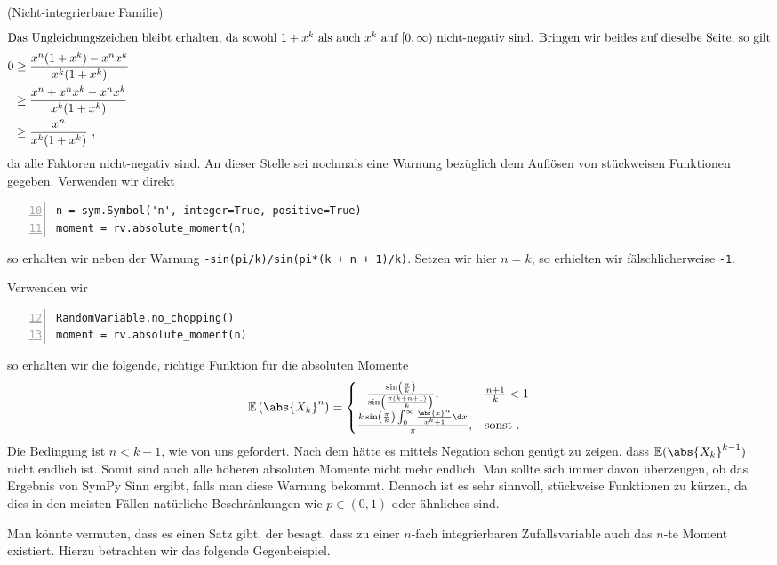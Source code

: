 \begin{Beispiel}{(Nicht-integrierbare Familie)}
\begin{align*}
\intertext{Das Ungleichungszeichen bleibt erhalten, da sowohl $1 + x^k$ als auch $x^k$ auf $[0, \infty)$ nicht-negativ sind. Bringen wir beides auf dieselbe Seite, so gilt}
0 &\geq \frac{x^n (1 + x^k) - x^n x^k}{x^k (1 + x^k)}\\
&\geq \frac{x^n + x^n x^k - x^n x^k}{x^k (1 + x^k)}\\
&\geq \frac{x^n}{x^k (1 + x^k)}~,
\end{align*}
da alle Faktoren nicht-negativ sind. An dieser Stelle sei nochmals eine Warnung bezüglich dem Auflösen von stückweisen Funktionen gegeben. Verwenden wir direkt
\begin{lstlisting}[numbers=left, numberstyle=\tiny\color{codegray}, firstnumber=10]
n = sym.Symbol('n', integer=True, positive=True)
moment = rv.absolute_moment(n)
\end{lstlisting}
so erhalten wir neben der Warnung \lstinline|-sin(pi/k)/sin(pi*(k + n + 1)/k)|. Setzen wir hier $n = k$, so erhielten wir fälschlicherweise \lstinline|-1|.

\newpage

Verwenden wir
\begin{lstlisting}[numbers=left, numberstyle=\tiny\color{codegray}, firstnumber=12]
RandomVariable.no_chopping()
moment = rv.absolute_moment(n)
\end{lstlisting}
so erhalten wir die folgende, richtige Funktion für die absoluten Momente
\[\mathbb{E}\left( \abs{X_k}^n \right) = \begin{cases}
- \frac{\sin\left( \frac{\pi}{k} \right)}{\sin\left( \frac{\pi (k + n + 1)}{k} \right)}, &\frac{n + 1}{k} < 1\\
\frac{k \sin\left(\frac{\pi}{k} \right) \int_0^\infty \frac{\abs{x}^n}{x^k + 1} \d x}{\pi}, &\text{sonst}~.
\end{cases}\]
Die Bedingung ist $n < k - 1$, wie von uns gefordert. Nach dem \hyperlink{Satz:Integrierbarkeit}{} hätte es mittels Negation schon genügt zu zeigen, dass $\mathbb{E}(\abs{X_k}^{k - 1})$ nicht endlich ist. Somit sind auch alle höheren absoluten Momente nicht mehr endlich. Man sollte sich immer davon überzeugen, ob das Ergebnis von SymPy Sinn ergibt, falls man diese Warnung bekommt. Dennoch ist es sehr sinnvoll, stückweise Funktionen zu kürzen, da dies in den meisten Fällen natürliche Beschränkungen wie $p \in (0, 1)$ oder ähnliches sind.
\end{Beispiel}

Man könnte vermuten, dass es einen Satz gibt, der besagt, dass zu einer $n$-fach integrierbaren Zufallsvariable auch das $n$-te Moment existiert. Hierzu betrachten wir das folgende Gegenbeispiel.

